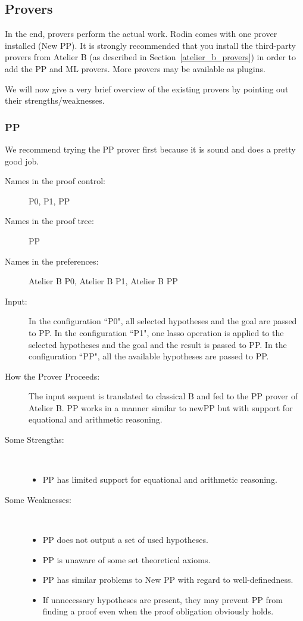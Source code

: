 \subsection{Provers}
\label{atelier_b_provers}

In the end, provers perform the actual work.  Rodin comes with one prover installed (New PP).  It is strongly recommended that you install the third-party provers from Atelier B (as described in Section~\ref{atelier_b_provers}) in order to add the PP and ML provers.  More provers may be available as plugins.

We will now give a very brief overview of the existing provers by pointing out their strengths/weaknesses.

\subsubsection{PP}

We recommend trying the PP prover first because it is sound and does a pretty good job.

\begin{description}
	\item[Names in the proof control:]  P0, P1, PP
	\item[Names in the proof tree:] PP
	\item[Names in the preferences:] Atelier B P0, Atelier B P1, Atelier B PP
	\item[Input:] In the configuration ``P0", all selected hypotheses and the goal are passed to PP. In the configuration ``P1", one lasso operation is applied to the selected hypotheses and the goal and the result is passed to PP. In the configuration ``PP", all the available hypotheses are passed to PP.
	\item[How the Prover Proceeds:] The input sequent is translated to classical B and fed to the PP prover of Atelier B. PP works in a manner similar to newPP but with support for equational and arithmetic reasoning.
	\item[Some Strengths:] ~
	\begin{itemize}
		\item PP has limited support for equational and arithmetic reasoning. 
	\end{itemize}
	\item[Some Weaknesses:] ~
\begin{itemize}
	\item PP does not output a set of used hypotheses.
	\item PP is unaware of some set theoretical axioms.
	\item PP has similar problems to New PP with regard to well-definedness.
	\item If unnecessary hypotheses are present, they may prevent PP from finding a proof even when the proof obligation obviously holds. 
\end{itemize}
\end{description}

